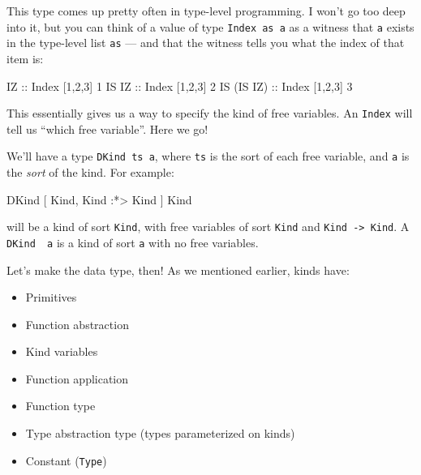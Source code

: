 \documentclass[]{article}
\newenvironment{Shaded}{}{}
\newcommand{\DataTypeTok}[1]{\textcolor[rgb]{0.56,0.13,0.00}{#1}}
\newcommand{\DecValTok}[1]{\textcolor[rgb]{0.25,0.63,0.44}{#1}}
\newcommand{\NormalTok}[1]{#1}
\newcommand{\OperatorTok}[1]{\textcolor[rgb]{0.40,0.40,0.40}{#1}}
\newcommand{\OtherTok}[1]{\textcolor[rgb]{0.00,0.44,0.13}{#1}}
\begin{document}
This type comes up pretty often in type-level programming. I won't go too deep
into it, but you can think of a value of type \texttt{Index\ as\ a} as a witness
that \texttt{a} exists in the type-level list \texttt{as} --- and that the
witness tells you what the index of that item is:

\begin{Shaded}
\begin{Highlighting}[]
\DataTypeTok{IZ}\OtherTok{         ::} \DataTypeTok{Index}\NormalTok{ \textquotesingle{}[}\DecValTok{1}\NormalTok{,}\DecValTok{2}\NormalTok{,}\DecValTok{3}\NormalTok{] }\DecValTok{1}
\DataTypeTok{IS} \DataTypeTok{IZ}\OtherTok{      ::} \DataTypeTok{Index}\NormalTok{ \textquotesingle{}[}\DecValTok{1}\NormalTok{,}\DecValTok{2}\NormalTok{,}\DecValTok{3}\NormalTok{] }\DecValTok{2}
\DataTypeTok{IS}\NormalTok{ (}\DataTypeTok{IS} \DataTypeTok{IZ}\NormalTok{)}\OtherTok{ ::} \DataTypeTok{Index}\NormalTok{ \textquotesingle{}[}\DecValTok{1}\NormalTok{,}\DecValTok{2}\NormalTok{,}\DecValTok{3}\NormalTok{] }\DecValTok{3}
\end{Highlighting}
\end{Shaded}

This essentially gives us a way to specify the kind of free variables. An
\texttt{Index} will tell us ``which free variable''. Here we go!

We'll have a type \texttt{DKind\ ts\ a}, where \texttt{ts} is the sort of each
free variable, and \texttt{a} is the \emph{sort} of the kind. For example:

\begin{Shaded}
\begin{Highlighting}[]
\DataTypeTok{DKind}\NormalTok{ \textquotesingle{}[ }\DataTypeTok{\textquotesingle{}Kind}\NormalTok{, }\DataTypeTok{\textquotesingle{}Kind}\NormalTok{ \textquotesingle{}}\OperatorTok{:*>} \DataTypeTok{\textquotesingle{}Kind}\NormalTok{ ] }\DataTypeTok{\textquotesingle{}Kind}
\end{Highlighting}
\end{Shaded}

will be a kind of sort \texttt{Kind}, with free variables of sort \texttt{Kind}
and \texttt{Kind\ -\textgreater{}\ Kind}. A
\texttt{DKind\ \textquotesingle{}{[}{]}\ a} is a kind of sort \texttt{a} with no
free variables.

Let's make the data type, then! As we mentioned earlier, kinds have:

\begin{itemize}
\tightlist
\item
  Primitives
\item
  Function abstraction
\item
  Kind variables
\item
  Function application
\item
  Function type
\item
  Type abstraction type (types parameterized on kinds)
\item
  Constant (\texttt{Type})
\end{itemize}
\end{document}
